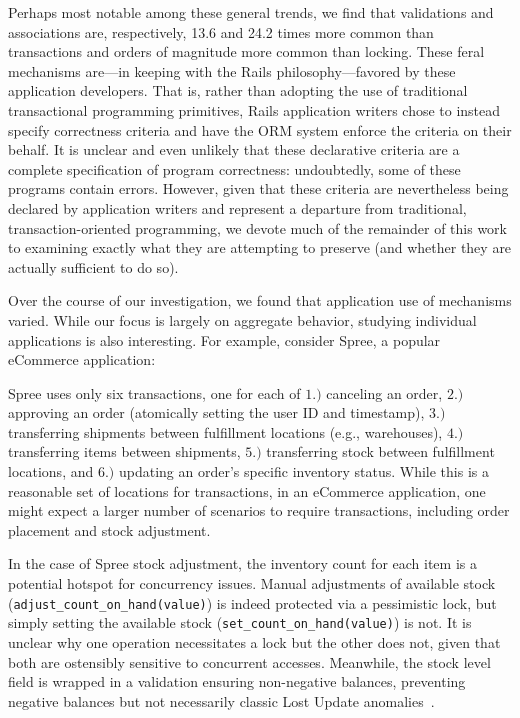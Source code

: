 Perhaps most notable among these general trends, we find that
validations and associations are, respectively, 13.6 and 24.2 times
more common than transactions and orders of magnitude more common than
locking. These feral mechanisms are---in keeping with the Rails
philosophy---favored by these application developers. That is, rather
than adopting the use of traditional transactional programming
primitives, Rails application writers chose to instead specify
correctness criteria and have the ORM system enforce the criteria on
their behalf. It is unclear and even unlikely that these declarative
criteria are a complete specification of program correctness:
undoubtedly, some of these programs contain errors. However, given
that these criteria are nevertheless being declared by application
writers and represent a departure from traditional,
transaction-oriented programming, we devote much of the remainder of
this work to examining exactly what they are attempting to preserve
(and whether they are actually sufficient to do so).

 Over the course of our
investigation, we found that application use of mechanisms
varied. While our focus is largely on aggregate behavior, studying
individual applications is also interesting. For example, consider
Spree, a popular eCommerce application:

Spree uses only six transactions, one for each of $1.)$ canceling an
order, $2.)$ approving an order (atomically setting the user ID and
timestamp), $3.)$ transferring shipments between fulfillment locations
(e.g., warehouses), $4.)$ transferring items between shipments, $5.)$
transferring stock between fulfillment locations, and $6.)$ updating an
order's specific inventory status. While this is a reasonable set of
locations for transactions, in an eCommerce application, one might
expect a larger number of scenarios to require transactions, including
order placement and stock adjustment.

In the case of Spree stock adjustment, the inventory count for each
item is a potential hotspot for concurrency issues. Manual
adjustments of available stock
(\texttt{adjust\_count\_on\_hand(value)}) is indeed protected via a
pessimistic lock, but simply setting the available stock
(\texttt{set\_count\_on\_hand(value)}) is not. It is unclear why one
operation necessitates a lock but the other does not, given that both
are ostensibly sensitive to concurrent accesses. Meanwhile, the stock
level field is wrapped in a validation ensuring non-negative balances,
preventing negative balances but not necessarily classic Lost Update
anomalies~\cite{adya-isolation}.

